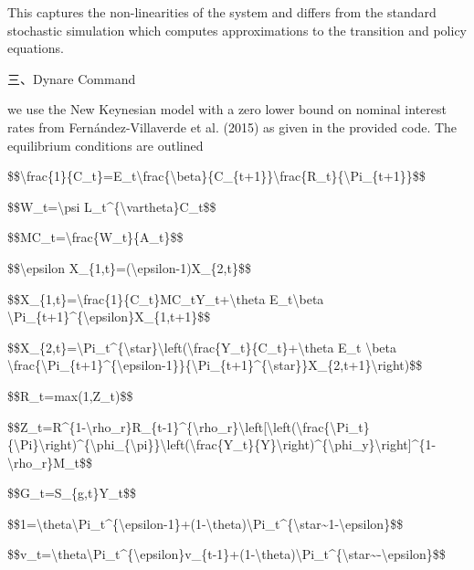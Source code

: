 \documentclass[10pt,math=newtx,citestyle=gb7714-2015,bibstyle=gb7714-2015]{elegantbook}
\begin{document}
	This captures the non-linearities of the system and differs from the standard stochastic simulation which computes approximations to the transition and policy equations.
	
	三、Dynare Command
	
	we use the New Keynesian model with a zero lower bound on nominal interest rates from Fernández-Villaverde et al. (2015) as given in the provided code. The equilibrium conditions are outlined
	
	\$\$\textbackslash{}frac\{1\}\{C\_t\}=E\_t\textbackslash{}frac\{\textbackslash{}beta\}\{C\_\{t+1\}\}\textbackslash{}frac\{R\_t\}\{\textbackslash{}Pi\_\{t+1\}\}\$\$
	
	\$\$W\_t=\textbackslash{}psi L\_t\^{}\{\textbackslash{}vartheta\}C\_t\$\$
	
	\$\$MC\_t=\textbackslash{}frac\{W\_t\}\{A\_t\}\$\$
	
	\$\$\textbackslash{}epsilon X\_\{1,t\}=(\textbackslash{}epsilon-1)X\_\{2,t\}\$\$
	
	\$\$X\_\{1,t\}=\textbackslash{}frac\{1\}\{C\_t\}MC\_tY\_t+\textbackslash{}theta E\_t\textbackslash{}beta \textbackslash{}Pi\_\{t+1\}\^{}\{\textbackslash{}epsilon\}X\_\{1,t+1\}\$\$
	
	\$\$X\_\{2,t\}=\textbackslash{}Pi\_t\^{}\{\textbackslash{}star\}\textbackslash{}left(\textbackslash{}frac\{Y\_t\}\{C\_t\}+\textbackslash{}theta E\_t \textbackslash{}beta \textbackslash{}frac\{\textbackslash{}Pi\_\{t+1\}\^{}\{\textbackslash{}epsilon-1\}\}\{\textbackslash{}Pi\_\{t+1\}\^{}\{\textbackslash{}star\}\}X\_\{2,t+1\}\textbackslash{}right)\$\$
	
	\$\$R\_t=max(1,Z\_t)\$\$
	
	\$\$Z\_t=R\^{}\{1-\textbackslash{}rho\_r\}R\_\{t-1\}\^{}\{\textbackslash{}rho\_r\}\textbackslash{}left[\textbackslash{}left(\textbackslash{}frac\{\textbackslash{}Pi\_t\}\{\textbackslash{}Pi\}\textbackslash{}right)\^{}\{\textbackslash{}phi\_\{\textbackslash{}pi\}\}\textbackslash{}left(\textbackslash{}frac\{Y\_t\}\{Y\}\textbackslash{}right)\^{}\{\textbackslash{}phi\_y\}\textbackslash{}right]\^{}\{1-\textbackslash{}rho\_r\}M\_t\$\$
	
	\$\$G\_t=S\_\{g,t\}Y\_t\$\$
	
	\$\$1=\textbackslash{}theta\textbackslash{}Pi\_t\^{}\{\textbackslash{}epsilon-1\}+(1-\textbackslash{}theta)\textbackslash{}Pi\_t\^{}\{\textbackslash{}star\~{}1-\textbackslash{}epsilon\}\$\$
	
	\$\$v\_t=\textbackslash{}theta\textbackslash{}Pi\_t\^{}\{\textbackslash{}epsilon\}v\_\{t-1\}+(1-\textbackslash{}theta)\textbackslash{}Pi\_t\^{}\{\textbackslash{}star\~{}-\textbackslash{}epsilon\}\$\$
	
\end{document}

